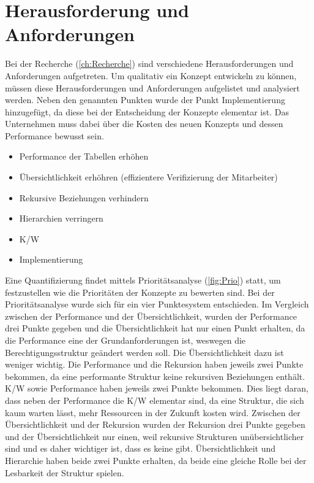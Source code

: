 \section{Herausforderung und Anforderungen}
\label{sec:chapter04:Herausforderung}
Bei der Recherche (\ref{ch:Recherche}) sind verschiedene Herausforderungen und Anforderungen aufgetreten.
Um qualitativ ein Konzept entwickeln zu können, müssen diese Herausforderungen und Anforderungen aufgelistet und analysiert werden.
Neben den genannten Punkten wurde der Punkt Implementierung hinzugefügt, da diese bei der Entscheidung der Konzepte elementar ist.
Das Unternehmen muss dabei über die Kosten des neuen Konzepts und dessen Performance bewusst sein.
\begin{itemize}
	\item Performance der Tabellen erhöhen 
	\item Übersichtlichkeit erhöhren (effizientere Verifizierung der Mitarbeiter)
	\item Rekursive Beziehungen verhindern
	\item Hierarchien verringern
	\item \ac{K/W}
	\item Implementierung
\end{itemize}
Eine Quantifizierung findet mittels Prioritätsanalyse (\ref{fig:Prio}) statt, um festzustellen wie die Prioritäten der Konzepte zu bewerten sind. \cite{BdIufH}
Bei der Prioritätsanalyse wurde sich für ein vier Punktesystem entschieden.
\newline
Im Vergleich zwischen der Performance und der Übersichtlichkeit, wurden der Performance drei Punkte gegeben und die Übersichtlichkeit hat nur einen Punkt erhalten, da die Performance eine der Grundanforderungen ist, weswegen die Berechtigungsstruktur geändert werden soll.
Die Übersichtlichkeit dazu ist weniger wichtig.
Die Performance und die Rekursion haben jeweils zwei Punkte bekommen, da eine performante Struktur keine rekursiven Beziehungen enthält.
\ac{K/W} sowie Performance haben jeweils zwei Punkte bekommen.
Dies liegt daran, dass neben der Performance die \ac{K/W} elementar sind, da eine Struktur, die sich kaum warten lässt, mehr Ressourcen in der Zukunft kosten wird.
Zwischen der Übersichtlichkeit und der Rekursion wurden der Rekursion drei Punkte gegeben und der Übersichtlichkeit nur einen, weil rekursive Strukturen unübersichtlicher sind und es daher wichtiger ist, dass es keine gibt.
Übersichtlichkeit und Hierarchie haben beide zwei Punkte erhalten, da beide eine gleiche Rolle bei der Lesbarkeit der Struktur spielen.
